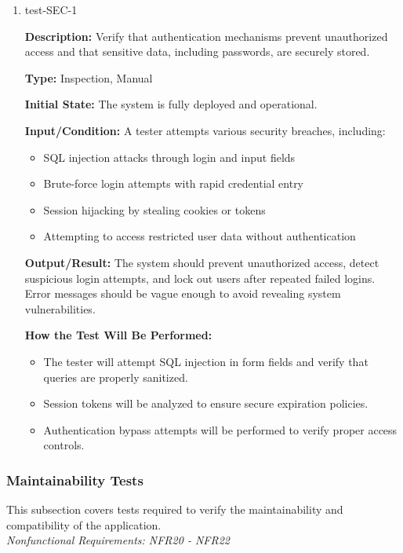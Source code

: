 \documentclass[12pt, titlepage]{article}
\begin{document}
\begin{enumerate}

\item{test-SEC-1\\}

\textbf{Description:} Verify that authentication mechanisms prevent unauthorized access and that sensitive data, including passwords, are securely stored.

\textbf{Type:} Inspection, Manual
					
\textbf{Initial State:} The system is fully deployed and operational.

\textbf{Input/Condition:} A tester attempts various security breaches, including:
\begin{itemize}
    \item SQL injection attacks through login and input fields
    \item Brute-force login attempts with rapid credential entry
    \item Session hijacking by stealing cookies or tokens
    \item Attempting to access restricted user data without authentication
\end{itemize}

\textbf{Output/Result:} The system should prevent unauthorized access, detect suspicious login attempts, and lock out users after repeated failed logins. Error messages should be vague enough to avoid revealing system vulnerabilities.

\textbf{How the Test Will Be Performed:} 
\begin{itemize}
    \item The tester will attempt SQL injection in form fields and verify that queries are properly sanitized.
    \item Session tokens will be analyzed to ensure secure expiration policies.
    \item Authentication bypass attempts will be performed to verify proper access controls.
\end{itemize}

\end{enumerate}

\subsubsection{Maintainability Tests}

This subsection covers tests required to verify the maintainability and compatibility of the application. \\
\textit{Nonfunctional Requirements: NFR20 - NFR22}
\end{document}
